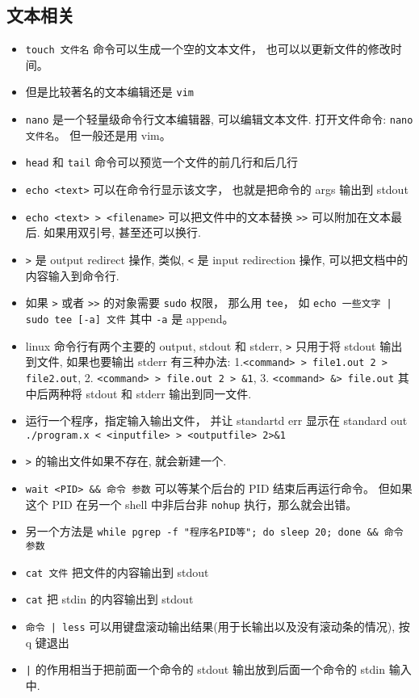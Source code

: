 \subsection{文本相关}
\begin{itemize}
\item \verb`touch 文件名` 命令可以生成一个空的文本文件， 也可以以更新文件的修改时间。
\item 但是比较著名的文本编辑还是 \verb`vim`
\item \verb`nano` 是一个轻量级命令行文本编辑器, 可以编辑文本文件. 打开文件命令: \verb`nano 文件名`。 但一般还是用 vim。
\item \verb`head` 和 \verb`tail` 命令可以预览一个文件的前几行和后几行
\item \verb`echo <text>` 可以在命令行显示该文字， 也就是把命令的 args 输出到 stdout
\item \verb`echo <text> > <filename>` 可以把文件中的文本替换 \verb`>>` 可以附加在文本最后. 如果用双引号, 甚至还可以换行.
\item \verb`>` 是 output redirect 操作, 类似, \verb`<` 是 input redirection 操作, 可以把文档中的内容输入到命令行.
\item 如果 \verb`>` 或者 \verb`>>` 的对象需要 \verb`sudo` 权限， 那么用 \verb`tee`， 如 \verb`echo 一些文字 | sudo tee [-a] 文件` 其中 \verb`-a` 是 append。
\item linux 命令行有两个主要的 output, stdout 和 stderr, \verb`>` 只用于将 stdout 输出到文件, 如果也要输出 stderr 有三种办法: 1.\verb`<command> > file1.out 2 > file2.out`, 2. \verb`<command> > file.out 2 > &1`, 3. \verb`<command> &> file.out` 其中后两种将 stdout 和 stderr 输出到同一文件.
\item 运行一个程序，指定输入输出文件， 并让 standartd err 显示在 standard out \verb`./program.x < <inputfile> > <outputfile> 2>&1` 
\item \verb`>` 的输出文件如果不存在, 就会新建一个.
\item \verb`wait <PID> && 命令 参数` 可以等某个后台的 PID 结束后再运行命令。 但如果这个 PID 在另一个 shell 中非后台非 \verb`nohup` 执行，那么就会出错。
\item 另一个方法是 \verb`while pgrep -f "程序名PID等"; do sleep 20; done && 命令 参数`
\item  \verb`cat 文件` 把文件的内容输出到 stdout
\item  \verb`cat` 把 stdin 的内容输出到 stdout
\item \verb`命令 | less` 可以用键盘滚动输出结果(用于长输出以及没有滚动条的情况), 按 q 键退出
\item \verb`|` 的作用相当于把前面一个命令的 stdout 输出放到后面一个命令的 stdin 输入中.

\end{itemize}
